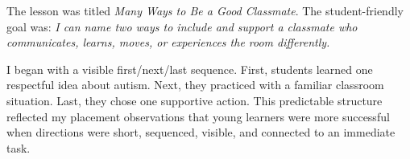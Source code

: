 \newpage
{}

The lesson was titled \textit{Many Ways to Be a Good Classmate}. The student-friendly goal was: \textit{I can name two ways to include and support a classmate who communicates, learns, moves, or experiences the room differently.}

I began with a visible first/next/last sequence. First, students learned one respectful idea about autism. Next, they practiced with a familiar classroom situation. Last, they chose one supportive action. This predictable structure reflected my placement observations that young learners were more successful when directions were short, sequenced, visible, and connected to an immediate task.
